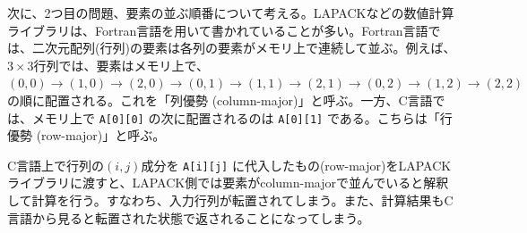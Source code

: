 次に、2つ目の問題、要素の並ぶ順番について考える。LAPACKなどの数値計算ライブラリは、Fortran言語を用いて書かれていることが多い。Fortran言語では、二次元配列(行列)の要素は各列の要素がメモリ上で連続して並ぶ。例えば、$3 \times 3$行列では、要素はメモリ上で、$(0,0) \rightarrow (1,0) \rightarrow (2,0) \rightarrow (0,1) \rightarrow (1,1) \rightarrow (2,1) \rightarrow (0,2) \rightarrow (1,2) \rightarrow (2,2)$ の順に配置される。これを「列優勢 (column-major)」と呼ぶ。一方、C言語では、メモリ上で \verb|A[0][0]| の次に配置されるのは \verb|A[0][1]| である。こちらは「行優勢 (row-major)」と呼ぶ。
\begin{figure}[H]
\begin{center}
\end{center}
\end{figure}
C言語上で行列の$(i,j)$成分を \verb|A[i][j]| に代入したもの(row-major)をLAPACKライブラリに渡すと、LAPACK側では要素がcolumn-majorで並んでいると解釈して計算を行う。すなわち、入力行列が転置されてしまう。また、計算結果もC言語から見ると転置された状態で返されることになってしまう。

